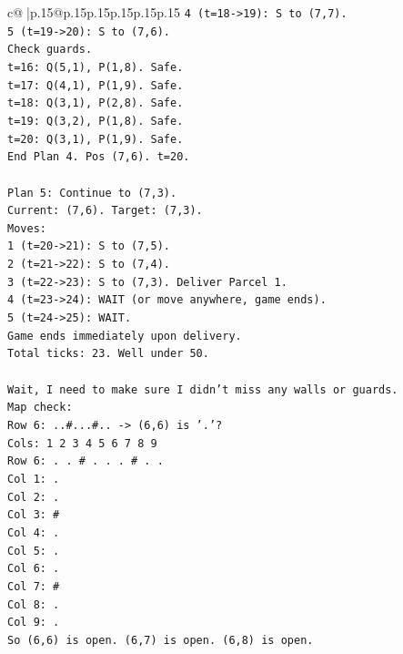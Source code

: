 \documentclass{article}
\begin{document}
{\begin{supertabular}{c@{$\;$}|p{.15\linewidth}@{}p{.15\linewidth}p{.15\linewidth}p{.15\linewidth}p{.15\linewidth}p{.15\linewidth}}
{{{\texttt{4 (t=18{-}>19): S to (7,7).} \\
\texttt{5 (t=19{-}>20): S to (7,6).} \\
\texttt{Check guards.} \\
\texttt{t=16: Q(5,1), P(1,8). Safe.} \\
\texttt{t=17: Q(4,1), P(1,9). Safe.} \\
\texttt{t=18: Q(3,1), P(2,8). Safe.} \\
\texttt{t=19: Q(3,2), P(1,8). Safe.} \\
\texttt{t=20: Q(3,1), P(1,9). Safe.} \\
\texttt{End Plan 4. Pos (7,6). t=20.} \\
\\ 
\texttt{Plan 5: Continue to (7,3).} \\
\texttt{Current: (7,6). Target: (7,3).} \\
\texttt{Moves:} \\
\texttt{1 (t=20{-}>21): S to (7,5).} \\
\texttt{2 (t=21{-}>22): S to (7,4).} \\
\texttt{3 (t=22{-}>23): S to (7,3). Deliver Parcel 1.} \\
\texttt{4 (t=23{-}>24): WAIT (or move anywhere, game ends).} \\
\texttt{5 (t=24{-}>25): WAIT.} \\
\texttt{Game ends immediately upon delivery.} \\
\texttt{Total ticks: 23. Well under 50.} \\
\\ 
\texttt{Wait, I need to make sure I didn't miss any walls or guards.} \\
\texttt{Map check:} \\
\texttt{Row 6: ..\#...\#.. {-}> (6,6) is '.'?} \\
\texttt{Cols: 1 2 3 4 5 6 7 8 9} \\
\texttt{Row 6: . . \# . . . \# . .} \\
\texttt{Col 1: .} \\
\texttt{Col 2: .} \\
\texttt{Col 3: \#} \\
\texttt{Col 4: .} \\
\texttt{Col 5: .} \\
\texttt{Col 6: .} \\
\texttt{Col 7: \#} \\
\texttt{Col 8: .} \\
\texttt{Col 9: .} \\
\texttt{So (6,6) is open. (6,7) is open. (6,8) is open.} \\
}}}
\end{supertabular}}
\end{document}
